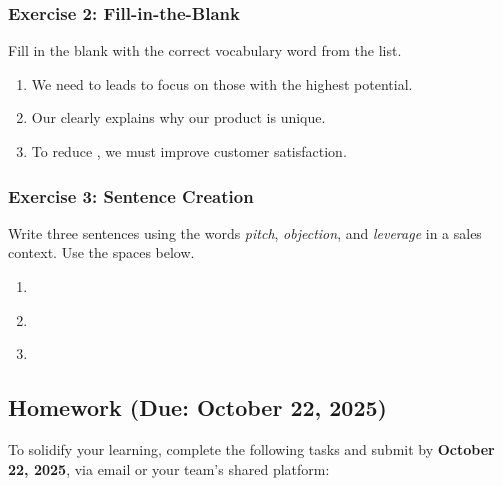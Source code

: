 \documentclass[11pt, a4paper]{article}
\begin{document}
\vspace{0.5cm}

\subsubsection{Exercise 2: Fill-in-the-Blank}
Fill in the blank with the correct vocabulary word from the list.

\begin{enumerate}
    \item We need to \underline{\hspace{3cm}} leads to focus on those with the highest potential. \\
    \item Our \underline{\hspace{3cm}} clearly explains why our product is unique. \\
    \item To reduce \underline{\hspace{3cm}}, we must improve customer satisfaction.
\end{enumerate}

\vspace{0.5cm}

\subsubsection{Exercise 3: Sentence Creation}
Write three sentences using the words \textit{pitch}, \textit{objection}, and \textit{leverage} in a sales context. Use the spaces below.

\begin{enumerate}
    \item \underline{\hspace{10cm}} \\
          \vspace{0.3cm}
    \item \underline{\hspace{10cm}} \\
          \vspace{0.3cm}
    \item \underline{\hspace{10cm}} \\
          \vspace{0.3cm}
\end{enumerate}

\subsection{Homework (Due: October 22, 2025)}
To solidify your learning, complete the following tasks and submit by \textbf{October 22, 2025}, via email or your team’s shared platform:
\end{document}
